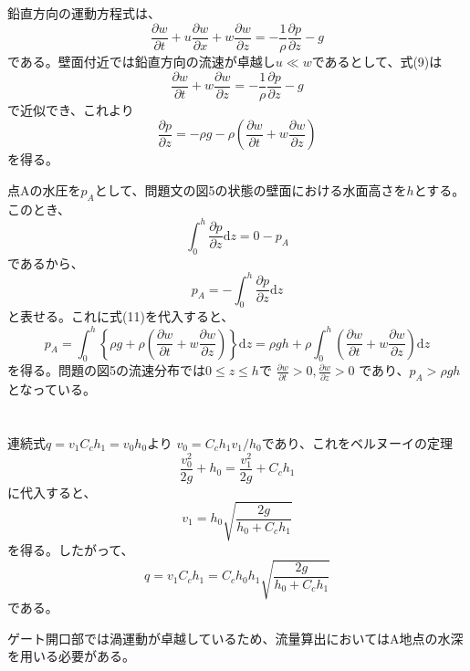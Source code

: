 \documentclass[a4paper]{jsarticle}
\begin{document}
\subsection{}
鉛直方向の運動方程式は、
\begin{equation}
  \frac{\partial w}{\partial t}
  + u \frac{\partial w}{\partial x}
  + w \frac{\partial w}{\partial z}
  = - \frac{1}{\rho} \frac{\partial p}{\partial z} - g
\end{equation}
である。壁面付近では鉛直方向の流速が卓越し$u \ll w$であるとして、式(9)は
\begin{equation}
  \frac{\partial w}{\partial t}
  + w \frac{\partial w}{\partial z}
  = - \frac{1}{\rho} \frac{\partial p}{\partial z} - g
\end{equation}
で近似でき、これより
\begin{equation}
  \frac{\partial p}{\partial z} = -\rho g
  - \rho \left(\frac{\partial w}{\partial t}
  + w \frac{\partial w}{\partial z}\right)
\end{equation}
を得る。\par
点Aの水圧を$p_A$として、問題文の図5の状態の壁面における水面高さを$h$とする。
このとき、
\begin{equation}
  \int_0^h \frac{\partial p}{\partial z} \mathrm{d} z = 0 - p_A
\end{equation}
であるから、
\begin{equation}
  p_A = -\int_0^h \frac{\partial p}{\partial z} \mathrm{d} z
\end{equation}
と表せる。これに式(11)を代入すると、
\begin{equation}
  p_A = \int_0^h \left\{\rho g
  + \rho \left(\frac{\partial w}{\partial t}
  + w \frac{\partial w}{\partial z}\right)\right\} \mathrm{d} z
  = \rho g h + \rho \int_0^h
  \left(\frac{\partial w}{\partial t}
  + w \frac{\partial w}{\partial z}\right) \mathrm{d} z
\end{equation}
を得る。問題の図5の流速分布では$0 \leq z \leq h$で
$\frac{\partial w}{\partial t} > 0, \frac{\partial w}{\partial z} > 0$
であり、$p_A > \rho g h$となっている。

\section{}
\subsection{}
連続式$q = v_1 C_c h_1 = v_0 h_0$より
$v_0 = C_c h_1 v_1 / h_0$であり、これをベルヌーイの定理
\begin{equation}
  \frac{v_0^2}{2g} + h_0 = \frac{v_1^2}{2g} + C_c h_1
\end{equation}
に代入すると、
\begin{equation}
  v_1 = h_0 \sqrt{\frac{2g}{h_0 + C_c h_1}}
\end{equation}
を得る。したがって、
\begin{equation}
  q = v_1 C_c h_1 = C_c h_0 h_1 \sqrt{\frac{2g}{h_0 + C_c h_1}}
\end{equation}
である。\par
ゲート開口部では渦運動が卓越しているため、流量算出においてはA地点の水深を用いる必要がある。
\end{document}
